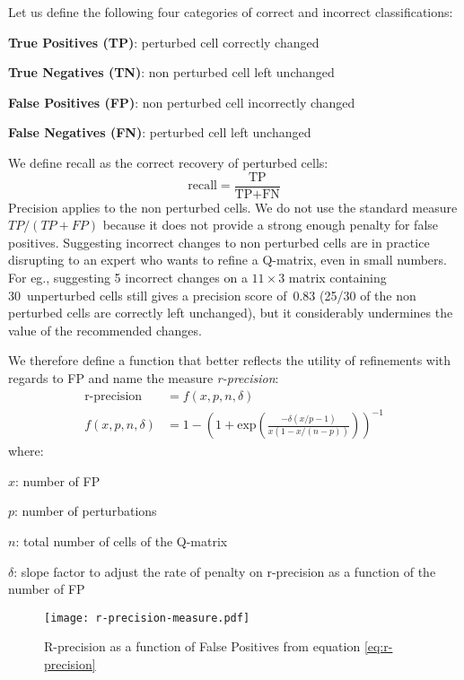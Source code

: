 \documentclass{edm_template}
\begin{document}
Let us define the following four categories of correct and incorrect classifications:
\begin{compactitem}
\item \textbf{True Positives (TP)}: perturbed cell correctly changed
\item \textbf{True Negatives (TN)}: non perturbed cell left unchanged
\item \textbf{False Positives (FP)}: non perturbed cell incorrectly changed
\item \textbf{False Negatives (FN)}: perturbed cell left unchanged
\end{compactitem}
We define recall as the correct recovery of perturbed cells:
 $$ \mathrm{recall}=\frac{\textrm{TP}}{\textrm{TP}+\textrm{FN}}$$
Precision applies to the non perturbed cells.  We do not use the standard measure $TP / (TP + FP)$ because it does not provide a strong enough penalty for false positives. Suggesting incorrect changes to non perturbed cells are in practice disrupting to an expert who wants to refine a Q-matrix, even in small numbers.  For eg., suggesting 5 incorrect changes on a $11\times 3$ matrix containing 30~unperturbed cells still gives a precision score of~0.83 (25/30 of the non perturbed cells are correctly left unchanged), but it considerably undermines the value of the recommended changes.

We therefore define a function that better reflects the utility of refinements with regards to FP and name the measure \textit{r-precision}:
\newcommand\rprec{\operatorname{r-precision}}
\begin{align}
\rprec & =  f(x, p, n, \delta) \label{eq:r-precision} \\
f(x, p, n, \delta) & =  1- \left( 1 +  \mathrm{exp}\left( \frac{-\delta (x/p - 1)}{x(1-x/(n-p))} \right) \right)^{-1} \nonumber
\end{align}
where:
\begin{compactitem}
\item[$x$:] number of FP
\item[$p$:] number of perturbations
\item[$n$:] total number of cells of the Q-matrix
\item[$\delta$:] slope factor to adjust the rate of penalty on r-precision as a function of the number of FP
\end{compactitem}

\begin{figure}
  \centerline{\texttt{[image: r-precision-measure.pdf]}}
  \caption{R-precision as a function of False Positives from equation \ref{eq:r-precision}}
  \label{fig:r-precision}
\end{figure}
\end{document}
